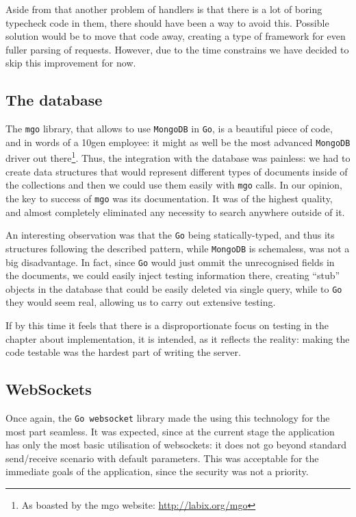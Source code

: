 \documentclass{l3proj}
\begin{document}
Aside from that another problem of handlers is that there is a lot of boring typecheck code in them, there should have been a way to avoid this. Possible solution would be to move that code away, creating a type of framework for even fuller parsing of requests. However, due to the time constrains we have decided to skip this improvement for now.

\subsection{The database}

The \texttt{mgo} library, that allows to use \texttt{MongoDB} in \texttt{Go}, is a beautiful piece of code, and in words of a 10gen employee: it might as well be the most advanced \texttt{MongoDB} driver out there\footnote{\raggedright{}As boasted by the mgo website: \url{http://labix.org/mgo}}. Thus, the integration with the database was painless: we had to create data structures that would represent different types of documents inside of the collections and then we could use them easily with \texttt{mgo} calls. In our opinion, the key to success of \texttt{mgo} was its documentation. It was of the highest quality, and almost completely eliminated any necessity to search anywhere outside of it.

An interesting observation was that the \texttt{Go} being statically-typed, and thus its structures following the described pattern, while \texttt{MongoDB} is schemaless, was not a big disadvantage. In fact, since \texttt{Go} would just ommit the unrecognised fields in the documents, we could easily inject testing information there, creating ``stub'' objects in the database that could be easily deleted via single query, while to \texttt{Go} they would seem real, allowing us to carry out extensive testing.

If by this time it feels that there is a disproportionate focus on testing in the chapter about implementation, it is intended, as it reflects the reality: making the code testable was the hardest part of writing the server.

\subsection{WebSockets}

Once again, the \texttt{Go websocket} library made the using this technology for the most part seamless. It was expected, since at the current stage the application has only the most basic utilisation of websockets: it does not go beyond standard send/receive scenario with default parameters. This was acceptable for the immediate goals of the application, since the security was not a priority.
\end{document}
